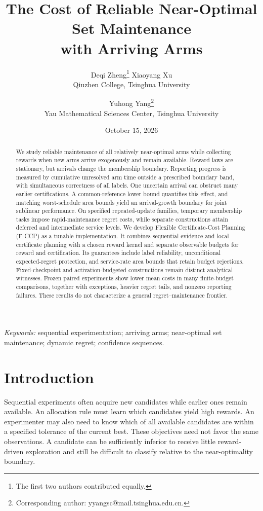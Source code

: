\documentclass[11pt]{article}
\title{The Cost of Reliable Near-Optimal Set Maintenance\\with Arriving Arms}
\author{}
\author{Deqi Zheng\thanks{The first two authors contributed equally.} \quad
 Xiaoyang Xu\footnotemark[1] \\ Qiuzhen College, Tsinghua University
 \and Yuhong Yang\thanks{Corresponding author: yyangsc@mail.tsinghua.edu.cn.}\\
 Yau Mathematical Sciences Center, Tsinghua University}
\date{October 15, 2026}
\theoremstyle{remark}
\begin{document}
\maketitle
{}

\begin{abstract}
We study reliable maintenance of all relatively near-optimal arms while
collecting rewards when new arms arrive exogenously and remain available.
Reward laws are stationary, but arrivals change the membership boundary.
Reporting progress is measured by cumulative unresolved arm time outside
a prescribed boundary band, with simultaneous correctness of all labels.
One uncertain arrival can obstruct many earlier certifications. A
common-reference lower bound quantifies this effect, and matching
worst-schedule area bounds yield an arrival-growth boundary for joint
sublinear performance. On specified repeated-update families, temporary
membership tasks impose rapid-maintenance regret costs, while separate
constructions attain deferred and intermediate service levels. We develop
Flexible Certificate-Cost Planning (F-CCP) as a tunable implementation. It
combines sequential evidence and local certificate planning with a chosen
reward kernel and separate observable budgets for reward and
certification. Its guarantees include label reliability, unconditional
expected-regret protection, and service-rate area bounds that retain
budget rejections. Fixed-checkpoint and activation-budgeted constructions
remain distinct analytical witnesses. Frozen paired experiments show
lower mean costs in many finite-budget comparisons, together with
exceptions, heavier regret tails, and nonzero reporting failures. These
results do not characterize a general regret--maintenance frontier.
\end{abstract}
\noindent\textit{Keywords:} sequential experimentation; arriving arms;
near-optimal set maintenance; dynamic regret; confidence sequences.

\section{Introduction}
\label{sec:introduction}

Sequential experiments often acquire new candidates while earlier ones remain
available. An allocation rule must learn which candidates yield high rewards.
An experimenter may also need to know which of all available candidates are
within a specified tolerance of the current best. These objectives need not
favor the same observations. A candidate can be sufficiently inferior to
receive little reward-driven exploration and still be difficult to classify
relative to the near-optimality boundary.
\end{document}
